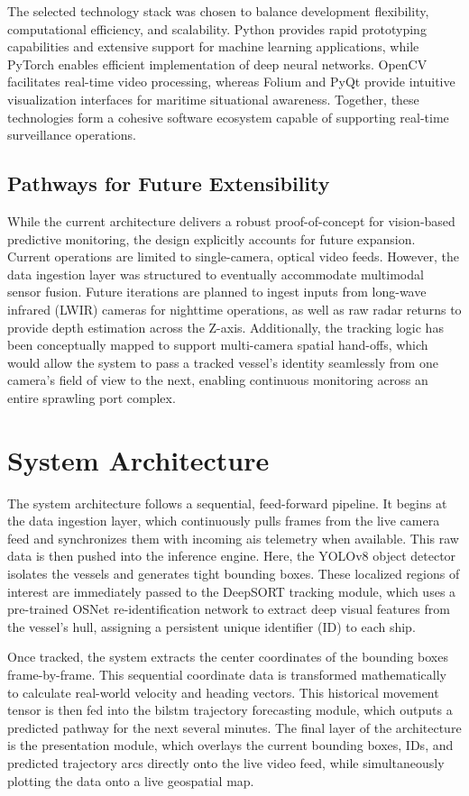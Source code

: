 The selected technology stack was chosen to balance development flexibility, computational efficiency, and scalability. Python provides rapid prototyping capabilities and extensive support for machine learning applications, while PyTorch enables efficient implementation of deep neural networks. OpenCV facilitates real-time video processing, whereas Folium and PyQt provide intuitive visualization interfaces for maritime situational awareness. Together, these technologies form a cohesive software ecosystem capable of supporting real-time surveillance operations.

\subsection{Pathways for Future Extensibility}
While the current architecture delivers a robust proof-of-concept for vision-based predictive monitoring, the design explicitly accounts for future expansion. Current operations are limited to single-camera, optical video feeds. However, the data ingestion layer was structured to eventually accommodate multimodal sensor fusion. Future iterations are planned to ingest inputs from long-wave infrared (LWIR) cameras for nighttime operations, as well as raw radar returns to provide depth estimation across the Z-axis. Additionally, the tracking logic has been conceptually mapped to support multi-camera spatial hand-offs, which would allow the system to pass a tracked vessel's identity seamlessly from one camera's field of view to the next, enabling continuous monitoring across an entire sprawling port complex.

\section{System Architecture}
The system architecture follows a sequential, feed-forward pipeline. It begins at the data ingestion layer, which continuously pulls frames from the live camera feed and synchronizes them with incoming \gls{ais} telemetry when available. This raw data is then pushed into the inference engine. Here, the YOLOv8 object detector isolates the vessels and generates tight bounding boxes. These localized regions of interest are immediately passed to the DeepSORT tracking module, which uses a pre-trained OSNet re-identification network to extract deep visual features from the vessel's hull, assigning a persistent unique identifier (ID) to each ship.

Once tracked, the system extracts the center coordinates of the bounding boxes frame-by-frame. This sequential coordinate data is transformed mathematically to calculate real-world velocity and heading vectors. This historical movement tensor is then fed into the \gls{bilstm} trajectory forecasting module, which outputs a predicted pathway for the next several minutes. The final layer of the architecture is the presentation module, which overlays the current bounding boxes, IDs, and predicted trajectory arcs directly onto the live video feed, while simultaneously plotting the data onto a live geospatial map.

